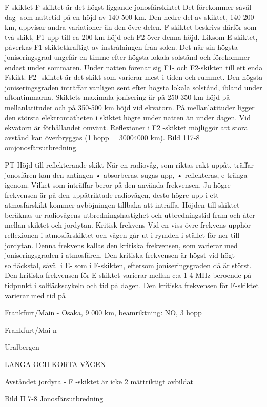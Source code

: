 \documentclass[a4paper,twoside,twocolumn,openright]{book}
\begin{document}
{{{{{{F-skiktet
F-skiktet är det högst liggande jonosfärskiktet
Det förekommer såväl dag- som nattetid på
en höjd av 140-500 km. Den nedre del av
skiktet, 140-200 km, uppvisar andra variationer än den övre delen. F-skiktet beskrivs
därför som två skikt, F1 upp till ca 200 km
höjd och F2 över denna höjd.
Liksom E-skiktet, påverkas F1-skiktetkraftigt av instrålningen från solen. Det når sin
högsta joniseringsgrad ungefär en timme
efter högsta lokala solstånd och förekommer
endast under sommaren. Under natten förenar sig F1- och F2-skikten till ett enda Fskikt.
F2 -skiktet är det skikt som varierar mest i
tiden och rummet. Den högsta joniseringsgraden inträffar vanligen sent efter högsta
lokala solstånd, ibland under aftontimmarna.
Skiktets maximala jonisering är på 250-350
km höjd på mellanlatituder och på 350-500
km höjd vid ekvatorn. På mellanlatituder
ligger den största elektrontätheten i skiktet
högre under natten än under dagen. Vid
ekvatorn är förhållandet omvänt.
Reflexioner i F2 -skiktet möjliggör att stora
avstånd kan överbryggas (1 hopp = 30004000 km). Bild 117-8 omjonosfärsutbredning.

PT
Höjd till reflekterande skikt
När en radiovåg, som riktas rakt uppåt, träffar jonosfären kan den antingen
• absorberas, sugas upp,
• reflekteras,
e
tränga igenom.
Vilket som inträffar beror på den använda
frekvensen. Ju högre frekvensen är på den
uppåtriktade radiovågen, desto högre upp i
ett atmosfärskikt kommer avböjningen tillbaka att inträffa. Höjden till skiktet beräknas
ur radiovågens utbredningshastighet och
utbredningstid fram och åter mellan skiktet
och jordytan.
Kritisk frekvens
Vid en viss övre frekvens upphör reflexionen
i atmosfärskiktet och vågen går ut i rymden
i stället för ner till jordytan. Denna frekvens
kallas den kritiska frekvensen, som varierar
med joniseringsgraden i atmosfären. Den
kritiska frekvensen är högst vid högt solfläckstal, såväl i E- som i F-skikten, eftersom
joniseringsgraden då är störst. Den kritiska
frekvensen för E-skiktet varierar mellan c:a
1-4 MHz beroende på tidpunkt i solfläckscykeln och tid på dagen. Den kritiska frekvensen för F-skiktet varierar med tid på

Frankfurt/Main - Osaka, 9 000 km, beamriktning: NO, 3 hopp

Frankfurt/Mai n

Uralbergen

LANGA OCH KORTA VÄGEN

Avståndet jordyta - F -skiktet är icke
2
mättriktigt avbildat

Bild II 7-8 Jonosfärsutbredning

}}}}}}
\end{document}
